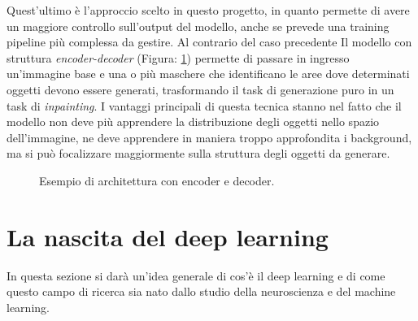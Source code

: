     Quest'ultimo è l'approccio scelto in questo progetto, in quanto permette di avere un maggiore controllo sull'output del modello,
    anche se prevede una training pipeline più complessa da gestire.
    Al contrario del caso precedente Il modello con struttura \textit{encoder-decoder} (Figura: \ref{fig:encoder_decoder_architecture}) permette di passare in ingresso 
    un'immagine base e una o più maschere che identificano le aree dove determinati oggetti devono essere generati, trasformando il task di generazione puro in 
    un task di \textit{inpainting}.
    I vantaggi principali di questa tecnica stanno nel fatto che il modello non deve più apprendere la distribuzione degli oggetti nello spazio dell'immagine,
    ne deve apprendere in maniera troppo approfondita i background, ma si può focalizzare maggiormente sulla struttura degli oggetti da generare.
    
    \begin{figure}[H]
        \centering
        
        \caption{Esempio di architettura con encoder e decoder.}
        \label{fig:encoder_decoder_architecture}
    \end{figure}

\section{La nascita del deep learning \ok}

In questa sezione si darà un'idea generale di cos'è il deep learning e di come questo campo di ricerca sia nato dallo studio della
neuroscienza e del machine learning.

